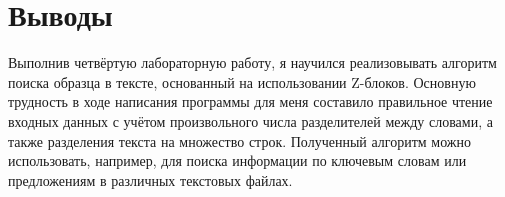 \section{Выводы}

Выполнив четвёртую лабораторную работу, я научился реализовывать алгоритм поиска образца в тексте, основанный на использовании Z-блоков. Основную трудность в ходе написания программы для меня составило правильное чтение входных данных с учётом произвольного числа разделителей между словами, а также разделения текста на множество строк. Полученный алгоритм можно использовать, например, для поиска информации по ключевым словам или предложениям в различных текстовых файлах.

\pagebreak
